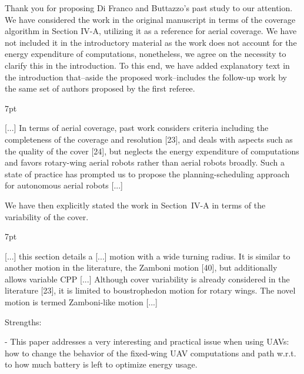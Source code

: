 \documentclass[10pt]{letter}
\newenvironment{formal}{%
  \def\FrameCommand{%
    \hspace{1pt}%
    {\color{red}\vrule width 2pt}%
    {\color{formalshade}\vrule width 4pt}%
    \colorbox{formalshade}%
  }%
  \MakeFramed{\advance\hsize-\width\FrameRestore}%
  \noindent\hspace{-4.55pt}%
  \begin{adjustwidth}{}{7pt}%
  \vspace{2pt}\vspace{2pt}%
}
{%
  \vspace{2pt}\end{adjustwidth}\endMakeFramed%
}
\begin{document}
{\color{blue} 

{\hspace*{-4.5em}{[R2:1]}\vspace*{-1.9em}}

Thank you for proposing Di Franco and Buttazzo's past study to our attention. We have considered the work in the original manuscript in terms of the coverage algorithm in Section IV-A, utilizing it as a reference for aerial coverage. We have not included it in the introductory material as the work does not account for the energy expenditure of computations, nonetheless, we agree on the necessity to clarify this in the introduction. To this end, we have added explanatory text in the introduction that--aside the proposed work--includes the follow-up work by the same set of authors proposed by the first referee.

\begin{formal}
  \color{black} [...] {\color{blue}In terms of aerial coverage, past work considers criteria including the completeness of the coverage and resolution [{\color{green}23}], and deals with aspects such as the quality of the cover [{\color{green}24}], but neglects the energy expenditure of computations and favors rotary-wing aerial robots rather than aerial robots broadly.} Such a state of practice has prompted us to propose the planning-scheduling approach for autonomous aerial robots [...]
  \vspace*{1ex}
\end{formal}

We have then explicitly stated the work in Section~IV-A
in terms of the variability of the cover.

\begin{formal}
  \color{black} [...] this section details a [...] motion with a wide turning radius. It is similar to another motion in the literature, the Zamboni
  motion [{\color{green}40}], but additionally allows variable CPP [...] {\color{blue} Although cover variability is already considered in the literature [{\color{green}23}], it is limited to boustrophedon motion for rotary wings.} The novel motion is termed Zamboni-like motion [...]
  \vspace*{1ex}
\end{formal}

}

\vspace{2em}

Strengths:

- This paper addresses a very interesting and practical issue when using UAVs: how to change the behavior of the fixed-wing UAV computations and path w.r.t. to how much battery is left to optimize energy usage.
\end{document}
